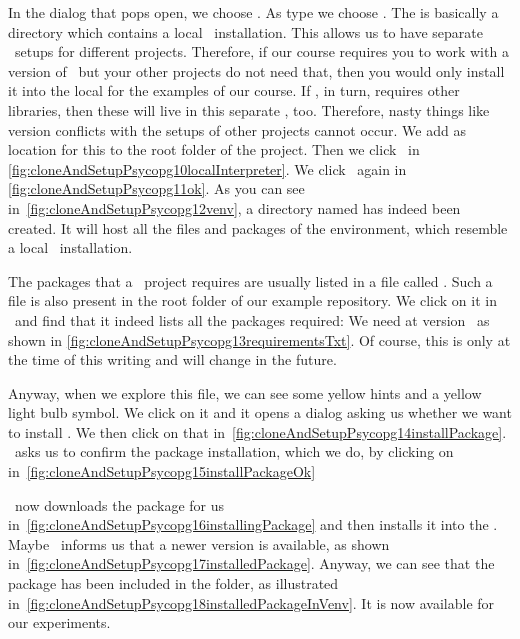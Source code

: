 In the dialog that pops open, we choose .
As type we choose .
The  is basically a directory which contains a local \python\ installation.
This allows us to have separate \python\ setups for different projects.
Therefore, if our course requires you to work with a version of \psycopg\ but your other projects do not need that, then you would only install it into the local  for the examples of our course.
If \psycopg, in turn, requires other libraries, then these will live in this separate , too.
Therefore, nasty things like version conflicts with the setups of other projects cannot occur.
We add  as location for this  to the root folder of the project.
Then we click~ in \cref{fig:cloneAndSetupPsycopg10localInterpreter}.
We click~ again in \cref{fig:cloneAndSetupPsycopg11ok}.
As you can see in~\cref{fig:cloneAndSetupPsycopg12venv}, a directory named  has indeed been created.
It will host all the files and packages of the environment, which resemble a local \python\ installation.

The packages that a \python\ project requires are usually listed in a file called .
Such a file is also present in the root folder of our example repository.
We click on it in \pycharm\ and find that it indeed lists all the packages required:
We need  at version~ as shown in \cref{fig:cloneAndSetupPsycopg13requirementsTxt}.
Of course, this is only at the time of this writing and will change in the future.

Anyway, when we explore this file, we can see some yellow hints and a yellow light bulb symbol.
We click on it and it opens a dialog asking us whether we want to install \psycopg.
We then click on that in~\cref{fig:cloneAndSetupPsycopg14installPackage}.
\pycharm\ asks us to confirm the package installation, which we do, by clicking on~ in~\cref{fig:cloneAndSetupPsycopg15installPackageOk}

\pycharm\ now downloads the package for us in~\cref{fig:cloneAndSetupPsycopg16installingPackage} and then installs it into the .
Maybe \pycharm\ informs us that a newer version is available, as shown in~\cref{fig:cloneAndSetupPsycopg17installedPackage}.
Anyway, we can see that the package has been included in the  folder, as illustrated in~\cref{fig:cloneAndSetupPsycopg18installedPackageInVenv}.
It is now available for our experiments.%
%
\FloatBarrier%
\endhsection%
%
\endhsection%
%
